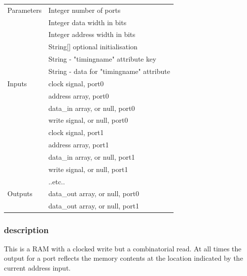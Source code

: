 \documentclass[10pt,a4paper,twoside,fleqn]{book}
\begin{document}
                    \begin{tabular}{| l | l |}
                    \hline
                    Parameters  & Integer number of ports \\
                                & Integer data width in bits \\
                                & Integer address width in bits \\
                                & String[] optional initialisation \\
                                & String - "timingname" attribute key \\
                                & String - data for "timingname" attribute \\
                    \hline
                    Inputs      & clock signal, port0 \\
                                & address array, port0 \\
                                & data\_in array, or null, port0 \\
                                & write signal, or null, port0 \\
                                & clock signal, port1 \\
                                & address array, port1 \\
                                & data\_in array, or null, port1 \\
                                & write signal, or null, port1 \\
                                & ..etc.. \\
                    \hline
                    Outputs     & data\_out array, or null, port0 \\
                                & data\_out array, or null, port1 \\
                    \hline
                    \end{tabular}

                \subsubsection{description}

                    This is a RAM with a clocked write but a combinatorial read.
                    At all times the output for a port reflects the memory
                    contents at the location indicated by the current address
                    input.
\end{document}
